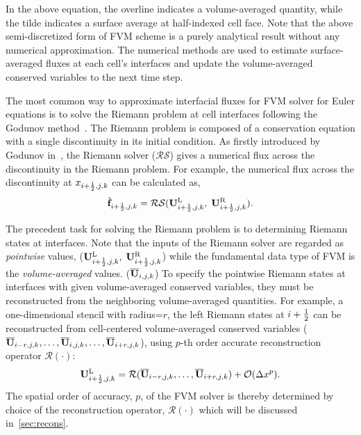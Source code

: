 In the above equation, the overline indicates a volume-averaged quantity,
while the tilde indicates a surface average at half-indexed cell face.
Note that the above semi-discretized form of FVM scheme is a purely analytical result
without any numerical approximation. The numerical methods are used to estimate
surface-averaged fluxes at each cell's interfaces and
update the volume-averaged conserved variables to the next time step.

The most common way to approximate interfacial fluxes for FVM solver for Euler equations is to solve
the Riemann problem at cell interfaces following the Godunov method~\cite{godunov1959difference}.
The Riemann problem is composed of a conservation equation with a single discontinuity
in its initial condition. As firstly introduced by Godunov in~\cite{godunov1959difference},
the Riemann solver (\( \mathcal{RS} \)) gives a numerical flux across the discontinuity in the Riemann problem.
For example, the numerical flux across the discontinuity at \( x_{{i+\frac{1}{2}},j,k} \)
can be calculated as,
\begin{equation}\label{eq:riemann_solver}
    \hat{\mathbf{f}}_{{i+\frac{1}{2}},j,k} = \mathcal{RS}(\mathbf{U}^{\text{L}}_{{i+\frac{1}{2}},j,k}, \; \mathbf{U}^{\text{R}}_{{i+\frac{1}{2}},j,k}).
\end{equation}

The precedent task for solving the Riemann problem is to determining Riemann states at interfaces.
Note that the inputs of the Riemann solver are regarded as \textit{pointwise} values, (\( \mathbf{U}^{\text{L}}_{{i+\frac{1}{2}},j,k}, \; \mathbf{U}^{\text{R}}_{{i+\frac{1}{2}},j,k} \))
while the fundamental data type of FVM is the \textit{volume-averaged} values. (\( \overline{\mathbf{U}}_{i,j,k} \))
To specify the pointwise Riemann states at interfaces with given volume-averaged conserved variables,
they must be reconstructed from the neighboring volume-averaged quantities.
For example, a one-dimensional stencil with radius=\( r \),
the left Riemann states at \( i + \frac{1}{2} \) can be reconstructed from
cell-centered volume-averaged conserved variables (\( \overline{\mathbf{U}}_{i-r,j,k}, \dots, \overline{\mathbf{U}}_{i,j,k}, \dots, \overline{\mathbf{U}}_{i+r,j,k} \)),
using \( p \)-th order accurate reconstruction operator \( \mathcal{R}(\cdot) \):
\begin{equation}\label{eq:fvm_recon}
    \mathbf{U}^{\text{L}}_{{i+\frac{1}{2}},j,k} = \mathcal{R}(\overline{\mathbf{U}}_{i-r,j,k}, \dots, \overline{\mathbf{U}}_{i+r,j,k}) + \mathcal{O} (\Delta x^{p}).
\end{equation}
The spatial order of accuracy, \( p \), of the FVM solver is thereby determined by choice of the reconstruction operator, \( \mathcal{R}(\cdot) \)
which will be discussed in~\cref{sec:recons}.

